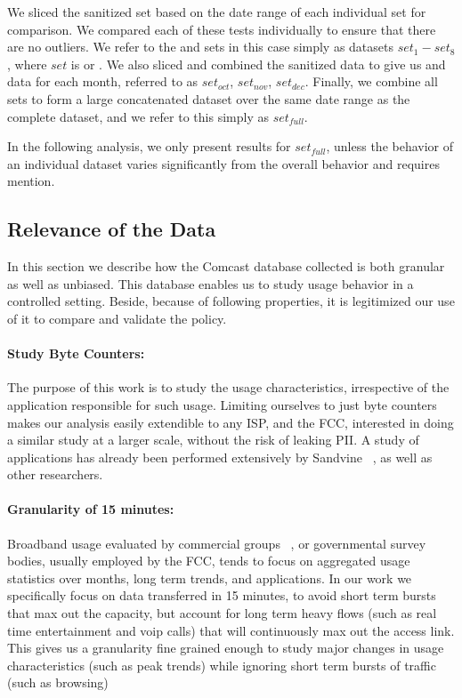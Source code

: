 We sliced the sanitized \test set based on the date range of each 
individual \control set for comparison. We compared each of these tests 
individually to ensure that there are no outliers. We refer to the \test and 
\control sets in this case simply as datasets $set_1 - set_8$, where $set$ is 
\test or \control. We also sliced and combined the sanitized data to give us 
\control and \test data for each month, referred to as $set_{oct}$, $set_{nov}$, 
$set_{dec}$. Finally, we combine all \control sets to form a large concatenated 
dataset over the same date range as the complete \test dataset, and we refer to 
this simply as $set_{full}$. 

In the following analysis, we only present results for $set_{full}$, unless the 
behavior of an individual dataset varies significantly from the overall behavior 
and requires mention.

\subsection{Relevance of the Data}
\label{subsec:data-relevance}

In this section we describe how the Comcast database collected is both granular 
as well as unbiased. This database enables us to study usage behavior in a 
controlled setting. Beside, because of following properties, it is legitimized 
our use of it to compare and validate the \FCC policy.

\paragraph{Study Byte Counters:} The purpose of this work is to study the usage 
characteristics, irrespective of the application responsible for such usage. 
Limiting ourselves to just byte counters makes our analysis easily extendible 
to any ISP, and the FCC, interested in doing a similar study at a larger 
scale, without the risk of leaking PII. A study of applications has already 
been performed extensively by Sandvine ~\cite{}, as well as other researchers.


\paragraph{Granularity of 15 minutes:} Broadband usage evaluated by commercial 
groups ~\cite{}, or governmental survey bodies, usually employed by the FCC, 
tends to focus on aggregated usage statistics over months, long term trends, and 
applications. In our work we specifically focus on data transferred in 15 
minutes, to avoid short term bursts that max out the capacity, but account for 
long term heavy flows (such as real time entertainment and voip calls) that will 
continuously max out the access link. This gives us a granularity fine grained 
enough to study major changes in usage characteristics (such as peak trends) 
while ignoring short term bursts of traffic (such as browsing)

